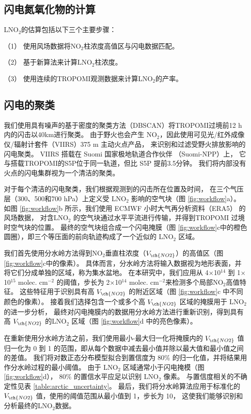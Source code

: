 \subsection{闪电氮氧化物的计算} \label{sec:arctic_lnox_calc}

LNO$_2$的估算包括以下三个主要步骤：

（1） 使用风场数据将NO$_2$柱浓度高值区与闪电数据匹配。

（2） 基于新算法来计算LNO$_2$柱浓度。

（3） 使用连续的TROPOMI观测数据来计算LNO$_2$的产率。

\subsection*{闪电的聚类}

我们使用具有噪声的基于密度的聚类方法（DBSCAN）将TROPOMI过境前12 h内\citep{Allen.2021a}的闪击以40km进行聚类\citep{backlund2011density,Schubert.2017}。
由于野火也会产生 NO$_2$，因此使用可见光/红外成像仪/辐射计套件（VIIRS）375 m 主动火点产品，
来识别和过滤受野火排放影响的闪电聚类。
VIIRS 搭载在 Suomi 国家极地轨道合作伙伴 （Suomi-NPP）上，
它与搭载TROPOMI的S5P位于同一轨道，但比 S5P 提前3.5分钟。
我们将内部没有火点的闪电集群视为一个清洁的聚类。

对于每个清洁的闪电聚类，我们根据观测到的闪击所在位置及时间，
在三个气压层（300、500和700 hPa）上定义受 LNO$_2$ 影响的空气块（图 \ref{fig:workflow}a）。
如图 \ref{fig:workflow}b 所示，我们使用 ECMWF 小时大气再分析资料（ERA5） 的风场数据\citep{Hersbach.2020}，
对含LNO$_2$ 的空气块通过水平平流进行传输，并得到TROPOMI 过境时空气块的位置。
最终的空气块组合成一个闪电掩膜（图 \ref{fig:workflow}c中的橙色圆圈），即三个等压面的前向轨迹构成了一个近似的 LNO$_2$ 区域。

我们首先使用分水岭方法得到NO$_2$垂直柱浓度（$V_{\ch{NO2}}$）的高值区（图 \ref{fig:workflow}c中的像素）。
具体而言，分水岭方法将输入数据视为地形表面，并将它们分成单独的区域，称为集水盆地\citep{Soille.1990,Heikenfeld.2019a}。
在本研究中，我们应用从 4$\times$10$^{14}$ 到 1$\times$10$^{15}$ molec. cm$^{-2}$ 的阈值，步长为 2$\times$10$^{14}$ molec. cm$^{-2}$来检测多个局部NO$_2$高值特征。
这些特征用于识别具有高 $V_{\ch{NO2}}$ 的附近区域（图 \ref{fig:workflow}c 中不同颜色的像素）。
接着我们选择包含一个或多个高 $V_{\ch{NO2}}$ 区域的掩膜用于 LNO$_2$ 的进一步分析，
最终对闪电掩膜内的数据用分水岭方法进行重新识别，得到具有高 $V_{\ch{NO2}}$ 的LNO$_2$ 区域（图 \ref{fig:workflow}d 中的亮色像素）。

在重新使用分水岭方法之前，我们使用最小-最大归一化将掩膜内的 $V_{\ch{NO2}}$ 值归一化为 0 到 1 的范围，即从每个数据中减去最小值并除以最大值和最小值之间的差值。
我们将对数正态分布模型拟合到置信度为 80\% 的归一化值，并将结果用作分水岭过程的最小阈值。
由于 LNO$_2$ 区域通常小于闪电掩模（图 \ref{fig:workflow}d），
80\% 的置信水平应足以识别 LNO$_2$ 像素。
与置信度相关的不确定性见表 \ref{table:arctic_uncertainty}。
最后，我们将分水岭算法应用于标准化的 $V_{\ch{NO2}}$ 值，使用的阈值范围从最小值到 1，步长为 10，
这使我们能够识别和分析最终的LNO$_2$数据。


